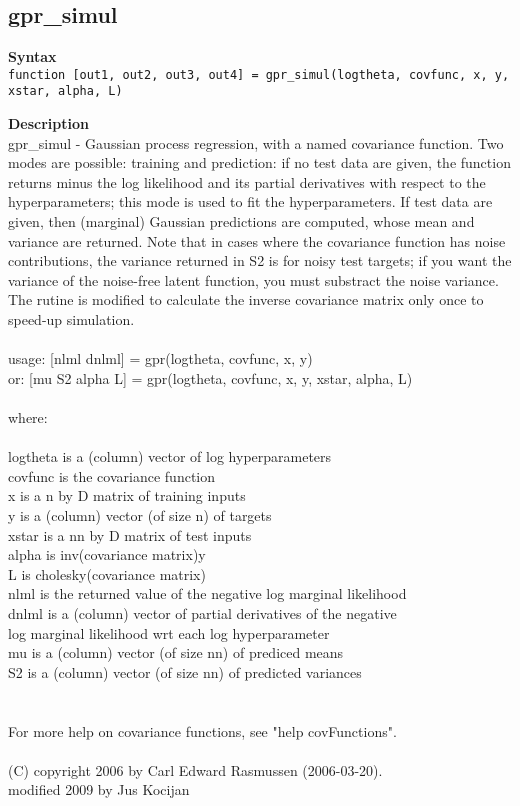 \subsection*{gpr\_simul} \label{fun:gpr_simul}


\textbf{Syntax}
\\ \texttt{function [out1, out2, out3, out4] = gpr\_simul(logtheta, covfunc, x, y, xstar, alpha, L)}


\textbf{Description}
\\ gpr\_simul - Gaussian process regression, with a named covariance function. Two
 modes are possible: training and prediction: if no test data are
given, the  function returns minus the log likelihood and its
partial derivatives with respect to the hyperparameters; this mode
is used to fit the hyperparameters. If test data are given, then
(marginal) Gaussian predictions are computed, whose mean and
variance are returned. Note that in cases where the covariance
function has noise contributions, the variance returned in S2 is
for noisy test targets; if you want the variance of the noise-free
latent function, you must substract the noise variance. The rutine
is modified to calculate the inverse covariance matrix only once
to speed-up simulation.
\\
\\ usage: [nlml dnlml] = gpr(logtheta, covfunc, x, y)
\\    or: [mu S2 alpha L]  = gpr(logtheta, covfunc, x, y, xstar, alpha, L)
\\
\\ where:
\\
\\   logtheta is a (column) vector of log hyperparameters
\\   covfunc  is the covariance function
\\   x        is a n by D matrix of training inputs
\\   y        is a (column) vector (of size n) of targets
\\   xstar    is a nn by D matrix of test inputs
\\   alpha    is inv(covariance matrix)y
\\   L        is cholesky(covariance matrix)
\\   nlml     is the returned value of the negative log marginal likelihood
\\   dnlml    is a (column) vector of partial derivatives of the negative
\\                 log marginal likelihood wrt each log hyperparameter
\\   mu       is a (column) vector (of size nn) of prediced means
\\   S2       is a (column) vector (of size nn) of predicted variances
\\
\\
\\ For more help on covariance functions, see "help covFunctions".
\\
\\ (C) copyright 2006 by Carl Edward Rasmussen (2006-03-20).
\\     modified  2009 by Jus Kocijan
